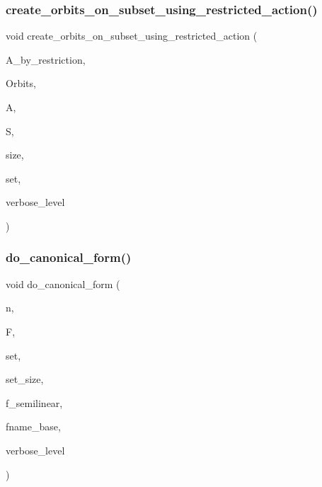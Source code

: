 \subsubsection{\texorpdfstring{create\+\_\+orbits\+\_\+on\+\_\+subset\+\_\+using\+\_\+restricted\+\_\+action()}{create\_orbits\_on\_subset\_using\_restricted\_action()}}
{\footnotesize\ttfamily void create\+\_\+orbits\+\_\+on\+\_\+subset\+\_\+using\+\_\+restricted\+\_\+action (\begin{DoxyParamCaption}\item[{\mbox{\hyperlink{classaction}{action}} $\ast$\&}]{A\+\_\+by\+\_\+restriction,  }\item[{\mbox{\hyperlink{classschreier}{schreier}} $\ast$\&}]{Orbits,  }\item[{\mbox{\hyperlink{classaction}{action}} $\ast$}]{A,  }\item[{\mbox{\hyperlink{classsims}{sims}} $\ast$}]{S,  }\item[{\mbox{\hyperlink{galois_8h_a09fddde158a3a20bd2dcadb609de11dc}{I\+NT}}}]{size,  }\item[{\mbox{\hyperlink{galois_8h_a09fddde158a3a20bd2dcadb609de11dc}{I\+NT}} $\ast$}]{set,  }\item[{\mbox{\hyperlink{galois_8h_a09fddde158a3a20bd2dcadb609de11dc}{I\+NT}}}]{verbose\+\_\+level }\end{DoxyParamCaption})}

\mbox{\label{action__global_8_c_afb9f4a331a8a017ea3b8b7d9ed8dcc88}} 
\subsubsection{\texorpdfstring{do\+\_\+canonical\+\_\+form()}{do\_canonical\_form()}}
{\footnotesize\ttfamily void do\+\_\+canonical\+\_\+form (\begin{DoxyParamCaption}\item[{\mbox{\hyperlink{galois_8h_a09fddde158a3a20bd2dcadb609de11dc}{I\+NT}}}]{n,  }\item[{\mbox{\hyperlink{classfinite__field}{finite\+\_\+field}} $\ast$}]{F,  }\item[{\mbox{\hyperlink{galois_8h_a09fddde158a3a20bd2dcadb609de11dc}{I\+NT}} $\ast$}]{set,  }\item[{\mbox{\hyperlink{galois_8h_a09fddde158a3a20bd2dcadb609de11dc}{I\+NT}}}]{set\+\_\+size,  }\item[{\mbox{\hyperlink{galois_8h_a09fddde158a3a20bd2dcadb609de11dc}{I\+NT}}}]{f\+\_\+semilinear,  }\item[{const \mbox{\hyperlink{galois_8h_ab6cc7b4aeb6ea31aba2b3fbfc83ff5e6}{B\+Y\+TE}} $\ast$}]{fname\+\_\+base,  }\item[{\mbox{\hyperlink{galois_8h_a09fddde158a3a20bd2dcadb609de11dc}{I\+NT}}}]{verbose\+\_\+level }\end{DoxyParamCaption})}


